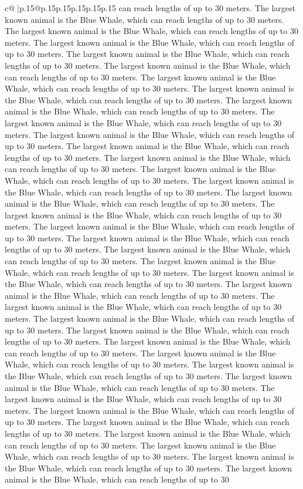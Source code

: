 \documentclass{article}
\begin{document}
{\begin{supertabular}{c@{$\;$}|p{.15\linewidth}@{}p{.15\linewidth}p{.15\linewidth}p{.15\linewidth}p{.15\linewidth}p{.15\linewidth}}
{{{can reach lengths of up to 30 meters. The largest known animal is the Blue Whale, which can reach lengths of up to 30 meters. The largest known animal is the Blue Whale, which can reach lengths of up to 30 meters. The largest known animal is the Blue Whale, which can reach lengths of up to 30 meters. The largest known animal is the Blue Whale, which can reach lengths of up to 30 meters. The largest known animal is the Blue Whale, which can reach lengths of up to 30 meters. The largest known animal is the Blue Whale, which can reach lengths of up to 30 meters. The largest known animal is the Blue Whale, which can reach lengths of up to 30 meters. The largest known animal is the Blue Whale, which can reach lengths of up to 30 meters. The largest known animal is the Blue Whale, which can reach lengths of up to 30 meters. The largest known animal is the Blue Whale, which can reach lengths of up to 30 meters. The largest known animal is the Blue Whale, which can reach lengths of up to 30 meters. The largest known animal is the Blue Whale, which can reach lengths of up to 30 meters. The largest known animal is the Blue Whale, which can reach lengths of up to 30 meters. The largest known animal is the Blue Whale, which can reach lengths of up to 30 meters. The largest known animal is the Blue Whale, which can reach lengths of up to 30 meters. The largest known animal is the Blue Whale, which can reach lengths of up to 30 meters. The largest known animal is the Blue Whale, which can reach lengths of up to 30 meters. The largest known animal is the Blue Whale, which can reach lengths of up to 30 meters. The largest known animal is the Blue Whale, which can reach lengths of up to 30 meters. The largest known animal is the Blue Whale, which can reach lengths of up to 30 meters. The largest known animal is the Blue Whale, which can reach lengths of up to 30 meters. The largest known animal is the Blue Whale, which can reach lengths of up to 30 meters. The largest known animal is the Blue Whale, which can reach lengths of up to 30 meters. The largest known animal is the Blue Whale, which can reach lengths of up to 30 meters. The largest known animal is the Blue Whale, which can reach lengths of up to 30 meters. The largest known animal is the Blue Whale, which can reach lengths of up to 30 meters. The largest known animal is the Blue Whale, which can reach lengths of up to 30 meters. The largest known animal is the Blue Whale, which can reach lengths of up to 30 meters. The largest known animal is the Blue Whale, which can reach lengths of up to 30 meters. The largest known animal is the Blue Whale, which can reach lengths of up to 30 meters. The largest known animal is the Blue Whale, which can reach lengths of up to 30 meters. The largest known animal is the Blue Whale, which can reach lengths of up to 30 meters. The largest known animal is the Blue Whale, which can reach lengths of up to 30 meters. The largest known animal is the Blue Whale, which can reach lengths of up to 30 meters. The largest known animal is the Blue Whale, which can reach lengths of up to 30 meters. The largest known animal is the Blue Whale, which can reach lengths of up to 30 }}}
\end{supertabular}}
\end{document}
